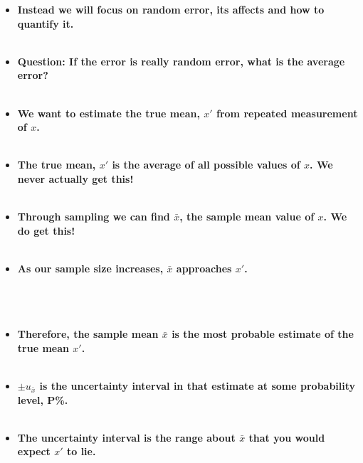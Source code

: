 \documentclass[11pt]{article}
\newcommand{\B}{\color{blue}}
\newcommand{\G}{\color{mygreen}}
\newcommand{\PR}{\color{mypurple}}
\begin{document}
\begin{itemize}
\begin{itemize}
		\item \textbf{ \Large Instead we will focus on {\bf \G random error}, its affects and how to quantify it. } \\\\
		
		\item \textbf{ \Large Question: If the error is really {\bf \G random error}, what is the average error? } \\\\
		
		
		\newpage
		\item \textbf{ \Large We want to estimate the {\bf \B true mean}, $x'$ from repeated measurement of $x$.} \\\\ 
		
		\item \textbf{ \Large The {\bf \B true mean}, $x'$ is the average of all possible values of $x$. We never actually get this!} \\\\ 
		
		\item \textbf{ \Large Through sampling we can find $\bar{x}$, the {\bf \G sample mean} value of $x$. We do get this!} \\\\ 
		
		\item \textbf{ \Large As our sample size increases, $\bar{x}$ approaches $x'$. } \\\\ 
		
		\\\\
		
		\item \textbf{ \Large Therefore, the sample mean $\bar{x}$ is the most probable estimate of the true mean $x'$. } \\\\ 
		
		\item \textbf{ \Large $\pm u_{\bar{x}}$ is the {\bf \PR uncertainty interval} in that estimate at some probability level, P\%. } \\\\ 
	
	         \item \textbf{ \Large The  {\bf \PR uncertainty interval} is the range about $\bar{x}$ that you would expect $x'$ to lie. } \\\\ 
	         

\end{itemize}
\end{itemize}
\end{document}

